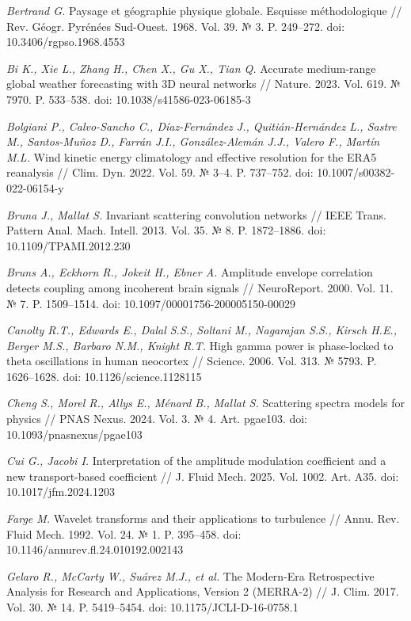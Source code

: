 \documentclass[12pt,a4paper]{article}
\begin{document}
\noindent \textit{Bertrand G.} Paysage et géographie physique globale. Esquisse méthodologique // Rev. Géogr. Pyrénées Sud-Ouest. 1968. Vol. 39. № 3. P. 249–272. doi: 10.3406/rgpso.1968.4553

\noindent \textit{Bi K., Xie L., Zhang H., Chen X., Gu X., Tian Q.} Accurate medium-range global weather forecasting with 3D neural networks // Nature. 2023. Vol. 619. № 7970. P. 533–538. doi: 10.1038/s41586-023-06185-3

\noindent \textit{Bolgiani P., Calvo-Sancho C., Díaz-Fernández J., Quitián-Hernández L., Sastre M., Santos-Muñoz D., Farrán J.I., González-Alemán J.J., Valero F., Martín M.L.} Wind kinetic energy climatology and effective resolution for the ERA5 reanalysis // Clim. Dyn. 2022. Vol. 59. № 3–4. P. 737–752. doi: 10.1007/s00382-022-06154-y

\noindent \textit{Bruna J., Mallat S.} Invariant scattering convolution networks // IEEE Trans. Pattern Anal. Mach. Intell. 2013. Vol. 35. № 8. P. 1872–1886. doi: 10.1109/TPAMI.2012.230

\noindent \textit{Bruns A., Eckhorn R., Jokeit H., Ebner A.} Amplitude envelope correlation detects coupling among incoherent brain signals // NeuroReport. 2000. Vol. 11. № 7. P. 1509–1514. doi: 10.1097/00001756-200005150-00029

\noindent \textit{Canolty R.T., Edwards E., Dalal S.S., Soltani M., Nagarajan S.S., Kirsch H.E., Berger M.S., Barbaro N.M., Knight R.T.} High gamma power is phase-locked to theta oscillations in human neocortex // Science. 2006. Vol. 313. № 5793. P. 1626–1628. doi: 10.1126/science.1128115

\noindent \textit{Cheng S., Morel R., Allys E., Ménard B., Mallat S.} Scattering spectra models for physics // PNAS Nexus. 2024. Vol. 3. № 4. Art. pgae103. doi: 10.1093/pnasnexus/pgae103

\noindent \textit{Cui G., Jacobi I.} Interpretation of the amplitude modulation coefficient and a new transport-based coefficient // J. Fluid Mech. 2025. Vol. 1002. Art. A35. doi: 10.1017/jfm.2024.1203

\noindent \textit{Farge M.} Wavelet transforms and their applications to turbulence // Annu. Rev. Fluid Mech. 1992. Vol. 24. № 1. P. 395–458. doi: 10.1146/annurev.fl.24.010192.002143

\noindent \textit{Gelaro R., McCarty W., Suárez M.J., et al.} The Modern-Era Retrospective Analysis for Research and Applications, Version 2 (MERRA-2) // J. Clim. 2017. Vol. 30. № 14. P. 5419–5454. doi: 10.1175/JCLI-D-16-0758.1
\end{document}
